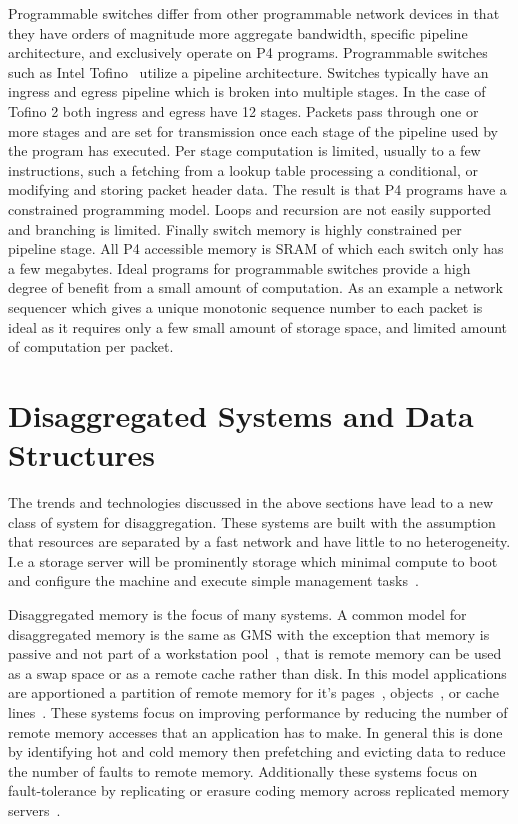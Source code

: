 \documentclass[12pt]{ucsddissertation}
\begin{document}
Programmable switches differ from other programmable network devices in that they have orders of
magnitude more aggregate bandwidth, specific pipeline architecture, and exclusively operate on P4
programs.
Programmable switches such as Intel Tofino~\cite{tofino2} utilize a pipeline architecture. Switches
typically have an ingress and egress pipeline which is broken into multiple stages. In the case of
Tofino 2 both ingress and egress have 12 stages. Packets pass through one or more stages and are set
for transmission once each stage of the pipeline used by the program has executed. Per stage
computation is limited, usually to a few instructions, such a fetching from a lookup table
processing a conditional, or modifying and storing packet header data. The result is that P4
programs have a constrained programming model. Loops and recursion are not easily supported and
branching is limited. Finally switch memory is highly constrained per pipeline stage. All P4
accessible memory is SRAM of which each switch only has a few megabytes.
Ideal programs for programmable switches provide a high degree of benefit from a small amount of
computation. As an example a network sequencer which gives a unique monotonic sequence number to
each packet is ideal as it requires only a few small amount of storage space, and limited amount of
computation per packet.

\section{Disaggregated Systems and Data Structures}

The trends and technologies discussed in the above sections have lead to a new class of system for
disaggregation. These systems are built with the assumption that resources are separated by a fast
network and have little to no heterogeneity. I.e a storage server will be prominently storage which
minimal compute to boot and configure the machine and execute simple management
tasks~\cite{aguilera2019designing,fast-networks,dis-and-app,legoos}.

Disaggregated memory is the focus of many systems. A common model for disaggregated memory is the
same as GMS with the exception that memory is passive and not part of a workstation pool~\cite{gms},
that is remote memory can be used as a swap space or as a remote cache rather than disk. In this
model applications are apportioned a partition of remote memory for it's
pages~\cite{infiniswap,fastswap,leap,blade-server,legoos,hydra}, objects~\cite{aifm,carbink}, or
cache lines~\cite{kona}. These systems focus on improving performance by reducing the number of
remote memory accesses that an application has to make. In general this is done by identifying hot
and cold memory then prefetching and evicting data to reduce the number of faults to remote memory.
Additionally these systems focus on fault-tolerance by replicating or erasure coding memory across
replicated memory servers~\cite{hydra}.
\end{document}
